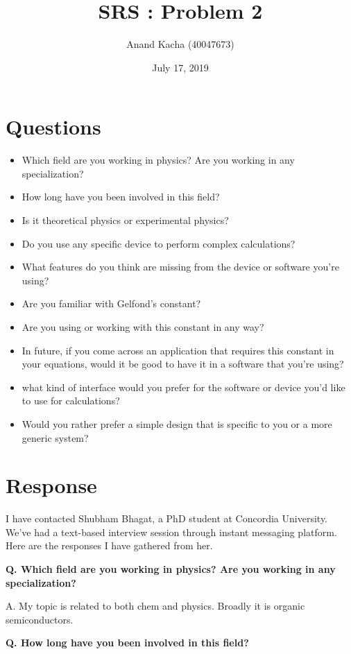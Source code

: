 \documentclass{article}
\title{SRS : Problem 2}
\author{Anand Kacha (40047673)}
\date{July 17, 2019}
\begin{document}
\maketitle

\section{Questions}
\justifying
\begin{itemize}
    \item Which field are you working in physics? Are you working in any specialization?
    \item How long have you been involved in this field?
    \item Is it theoretical physics or experimental physics?
    \item Do you use any specific device to perform complex calculations?
    \item What features do you think are missing from the device or software you're using?
    \item Are you familiar with Gelfond's constant?
    \item Are you using or working with this constant in any way?
    \item In future, if you come across an application that requires this constant in your equations, would it be good to have it in a software that you're using?
    \item what kind of interface would you prefer for the software or device you'd like to use for calculations?
    \item Would you rather prefer a simple design that is specific to you or a more generic system?
\end{itemize}

\section{Response}
\justifying
I have contacted Shubham Bhagat, a PhD student at Concordia University. We've had a text-based interview session through instant messaging platform. Here are the responses I have gathered from her.

\textbf{Q. Which field are you working in physics? Are you working in any specialization?}

A. My topic is related to both chem and physics. Broadly it is organic semiconductors.
\vspace{0.6em}

\textbf{Q. How long have you been involved in this field?}
\end{document}
